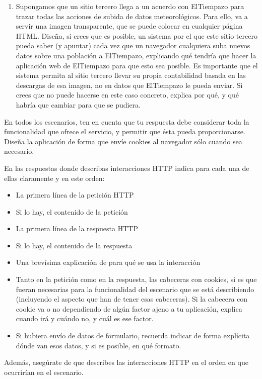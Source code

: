 \begin{enumerate}
\item Supongamos que un sitio tercero llega a un acuerdo con ElTiempazo para trazar todas las acciones de subida de datos meteorológicos. Para ello, va a servir una imagen transparente, que se puede colocar en cualquier página HTML. Diseña, si crees que es posible, un sistema por el que este sitio tercero pueda saber (y apuntar) cada vez que un navegador cualquiera suba nuevos datos sobre una población a ElTiempazo, explicando qué tendría que hacer la aplicación web de ElTiempazo para que esto sea posible. Es importante que el sistema permita al sitio tercero llevar su propia contabilidad basada en las descargas de esa imagen, no en datos que ElTiempazo le pueda enviar. Si crees que no puede hacerse en este caso concreto, explica por qué, y qué habría que cambiar para que se pudiera.
\end{enumerate}

En todos los escenarios, ten en cuenta que tu respuesta debe considerar toda la funcionalidad que ofrece el servicio, y permitir que ésta pueda proporcionarse. Diseña la aplicación de forma que envíe cookies al navegador sólo cuando sea necesario.

En las respuestas donde describas interacciones HTTP indica para cada una de ellas claramente y en este orden:
  \begin{itemize}
  \item La primera línea de la petición HTTP
  \item Si lo hay, el contenido de la petición
  \item La primera línea de la respuesta HTTP
  \item Si lo hay, el contenido de la respuesta
  \item Una brevísima explicación de para qué se usa la interacción
  \item Tanto en la petición como en la respuesta, las cabeceras con cookies, si es que fueran necesarias para la funcionalidad del escenario que se está describiendo (incluyendo el aspecto que han de tener esas cabeceras). Si la cabecera con cookie va o no dependiendo de algún factor ajeno a tu aplicación, explica cuando irá y cuándo no, y cuál es ese factor.
  \item Si hubiera envío de datos de formulario, recuerda indicar de forma explícita dónde van esos datos, y si es posible, en qué formato.
  \end{itemize}

Además, asegúrate de que describes las interacciones HTTP en el orden en que ocurrirían en el escenario.


